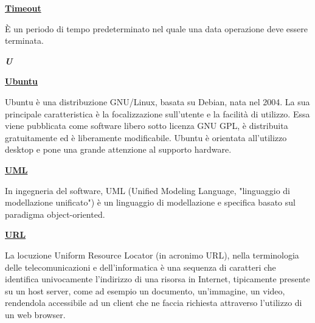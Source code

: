 \bigskip
\begin{addmargin}[0em]{0em}	
	\textbf{\underline{Timeout}}
\end{addmargin}

\medskip
\begin{addmargin}[5em]{1em}
È un periodo di tempo predeterminato nel quale una data operazione deve essere terminata.
\end{addmargin}

\newpage

\cleardoublepage
{}
{}
\noindent\hrulefill\hspace{4mm}\textbf{\textsl{\Huge{U}}}\hspace{4mm}\hrulefill
\vspace*{2\bigskipamount}	

\begin{addmargin}[0em]{0em}
	\textbf{\underline{Ubuntu}}
\end{addmargin}

\medskip
\begin{addmargin}[5em]{1em}
Ubuntu è una distribuzione GNU/Linux, basata su Debian, nata nel 2004. La sua principale caratteristica è la focalizzazione sull'utente e la facilità di utilizzo. Essa viene pubblicata come software libero sotto licenza GNU GPL, è distribuita gratuitamente ed è liberamente modificabile. Ubuntu è orientata all'utilizzo desktop e pone una grande attenzione al supporto hardware.
\end{addmargin}	

\bigskip
\begin{addmargin}[0em]{0em}	
	\textbf{\underline{UML}}
\end{addmargin}

\medskip
\begin{addmargin}[5em]{1em}
In ingegneria del software, UML (Unified Modeling Language, "linguaggio di modellazione unificato") è un linguaggio di modellazione e specifica basato sul paradigma object-oriented.
\end{addmargin}	

\bigskip
\begin{addmargin}[0em]{0em}	
	\textbf{\underline{URL}}
\end{addmargin}

\medskip
\begin{addmargin}[5em]{1em}
La locuzione Uniform Resource Locator (in acronimo URL), nella terminologia delle telecomunicazioni e dell'informatica è una sequenza di caratteri che identifica univocamente l'indirizzo di una risorsa in Internet, tipicamente presente su un host server, come ad esempio un documento, un'immagine, un video, rendendola accessibile ad un client che ne faccia richiesta attraverso l'utilizzo di un web browser.
\end{addmargin}
 
